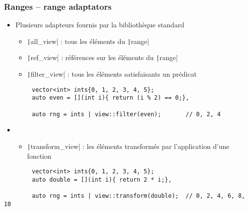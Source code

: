 \documentclass[C++.tex]{subfiles}
\begin{document}
\begin{frame}[fragile]
	\frametitle{Ranges -- range adaptators}
	\begin{itemize}
		\item Plusieurs adapteurs fournis par la bibliothèque standard


		\begin{itemize}
			\item \texttt|all_view| : tous les éléments du \texttt|range|
			\item \texttt|ref_view| : références sur les éléments du \texttt|range|
			\item \texttt|filter_view| : tous les éléments satisfaisants un prédicat
		\end{itemize}
	\end{itemize}

	\begin{verbatim}
		vector<int> ints{0, 1, 2, 3, 4, 5};
		auto even = [](int i){ return (i % 2) == 0;},

		auto rng = ints | view::filter(even);       // 0, 2, 4
	\end{verbatim}
 
	\begin{itemize}
		\item [] \begin{itemize}
			\item \texttt|transform_view| : les éléments transformés par l'application d'une fonction 
		\end{itemize}
	\end{itemize}

	\begin{verbatim}
		vector<int> ints{0, 1, 2, 3, 4, 5};
		auto double = [](int i){ return 2 * i;},

		auto rng = ints | view::transform(double);  // 0, 2, 4, 6, 8, 10
	\end{verbatim}
\end{frame}
\end{document}
